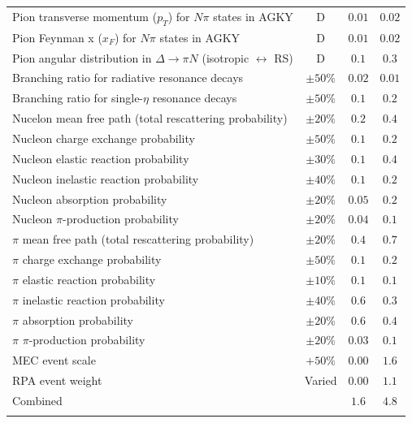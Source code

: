 \begin{longtable}{p{3.25in} c c c}
  Pion transverse momentum ($p_T$) for $N\pi$ states \newline in AGKY & D & $0.01$ & $0.02$ \\
  Pion Feynman x ($x_F$) for $N\pi$ states in AGKY & D & $0.01$ & $0.02$ \\
  Pion angular distribution in $\Delta \rightarrow \pi N$ \newline (isotropic $\leftrightarrow$ RS) & D & $0.1$ & $0.3$ \\
  Branching ratio for radiative resonance decays & $\pm50\%$ & $0.02$ & $0.01$ \\
  Branching ratio for single-$\eta$ resonance decays & $\pm50\%$ & $0.1$ & $0.2$ \\
  Nucelon mean free path (total rescattering \newline probability) & $\pm20\%$ & $0.2$ & $0.4$ \\
  Nucleon charge exchange probability & $\pm50\%$ & $0.1$ & $0.2$ \\
  Nucleon elastic reaction probability & $\pm30\%$ & $0.1$ & $0.4$ \\
  Nucleon inelastic reaction probability & $\pm40\%$ & $0.1$ & $0.2$ \\
  Nucleon absorption probability & $\pm20\%$ & $0.05$ & $0.2$ \\
  Nucleon $\pi$-production probability & $\pm20\%$ & $0.04$ & $0.1$ \\
  $\pi$ mean free path (total rescattering probability) & $\pm20\%$ & $0.4$ & $0.7$ \\
  $\pi$ charge exchange probability & $\pm50\%$ & $0.1$ & $0.2$ \\
  $\pi$ elastic reaction probability & $\pm10\%$ & $0.1$ & $0.1$ \\
  $\pi$ inelastic reaction probability & $\pm40\%$ & $0.6$ & $0.3$ \\
  $\pi$ absorption probability & $\pm20\%$ & $0.6$ & $0.4$ \\
  $\pi$ $\pi$-production probability & $\pm20\%$ & $0.03$ & $0.1$ \\
  MEC event scale & $+50\%$ & $0.00$ & $1.6$ \\
  RPA event weight & Varied & $0.00$ & $1.1$ \\
  \hline
  Combined & & $1.6$ & $4.8$ \\
  \hline
  \label{tab:SystGENIE}
\end{longtable}
\doublespacing

